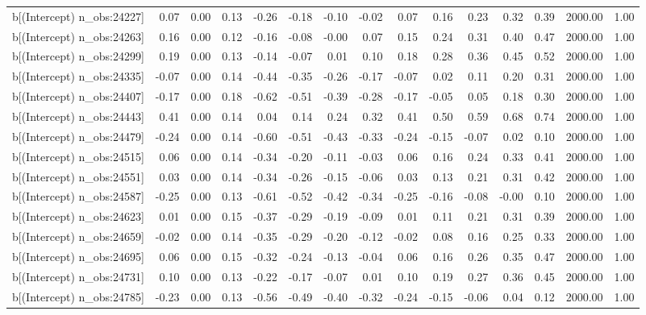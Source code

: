 \begin{table}[ht]
\begin{tabular}{rrrrrrrrrrrrrrr}
  b[(Intercept) n\_obs:24227] & 0.07 & 0.00 & 0.13 & -0.26 & -0.18 & -0.10 & -0.02 & 0.07 & 0.16 & 0.23 & 0.32 & 0.39 & 2000.00 & 1.00 \\ 
  b[(Intercept) n\_obs:24263] & 0.16 & 0.00 & 0.12 & -0.16 & -0.08 & -0.00 & 0.07 & 0.15 & 0.24 & 0.31 & 0.40 & 0.47 & 2000.00 & 1.00 \\ 
  b[(Intercept) n\_obs:24299] & 0.19 & 0.00 & 0.13 & -0.14 & -0.07 & 0.01 & 0.10 & 0.18 & 0.28 & 0.36 & 0.45 & 0.52 & 2000.00 & 1.00 \\ 
  b[(Intercept) n\_obs:24335] & -0.07 & 0.00 & 0.14 & -0.44 & -0.35 & -0.26 & -0.17 & -0.07 & 0.02 & 0.11 & 0.20 & 0.31 & 2000.00 & 1.00 \\ 
  b[(Intercept) n\_obs:24407] & -0.17 & 0.00 & 0.18 & -0.62 & -0.51 & -0.39 & -0.28 & -0.17 & -0.05 & 0.05 & 0.18 & 0.30 & 2000.00 & 1.00 \\ 
  b[(Intercept) n\_obs:24443] & 0.41 & 0.00 & 0.14 & 0.04 & 0.14 & 0.24 & 0.32 & 0.41 & 0.50 & 0.59 & 0.68 & 0.74 & 2000.00 & 1.00 \\ 
  b[(Intercept) n\_obs:24479] & -0.24 & 0.00 & 0.14 & -0.60 & -0.51 & -0.43 & -0.33 & -0.24 & -0.15 & -0.07 & 0.02 & 0.10 & 2000.00 & 1.00 \\ 
  b[(Intercept) n\_obs:24515] & 0.06 & 0.00 & 0.14 & -0.34 & -0.20 & -0.11 & -0.03 & 0.06 & 0.16 & 0.24 & 0.33 & 0.41 & 2000.00 & 1.00 \\ 
  b[(Intercept) n\_obs:24551] & 0.03 & 0.00 & 0.14 & -0.34 & -0.26 & -0.15 & -0.06 & 0.03 & 0.13 & 0.21 & 0.31 & 0.42 & 2000.00 & 1.00 \\ 
  b[(Intercept) n\_obs:24587] & -0.25 & 0.00 & 0.13 & -0.61 & -0.52 & -0.42 & -0.34 & -0.25 & -0.16 & -0.08 & -0.00 & 0.10 & 2000.00 & 1.00 \\ 
  b[(Intercept) n\_obs:24623] & 0.01 & 0.00 & 0.15 & -0.37 & -0.29 & -0.19 & -0.09 & 0.01 & 0.11 & 0.21 & 0.31 & 0.39 & 2000.00 & 1.00 \\ 
  b[(Intercept) n\_obs:24659] & -0.02 & 0.00 & 0.14 & -0.35 & -0.29 & -0.20 & -0.12 & -0.02 & 0.08 & 0.16 & 0.25 & 0.33 & 2000.00 & 1.00 \\ 
  b[(Intercept) n\_obs:24695] & 0.06 & 0.00 & 0.15 & -0.32 & -0.24 & -0.13 & -0.04 & 0.06 & 0.16 & 0.26 & 0.35 & 0.47 & 2000.00 & 1.00 \\ 
  b[(Intercept) n\_obs:24731] & 0.10 & 0.00 & 0.13 & -0.22 & -0.17 & -0.07 & 0.01 & 0.10 & 0.19 & 0.27 & 0.36 & 0.45 & 2000.00 & 1.00 \\ 
  b[(Intercept) n\_obs:24785] & -0.23 & 0.00 & 0.13 & -0.56 & -0.49 & -0.40 & -0.32 & -0.24 & -0.15 & -0.06 & 0.04 & 0.12 & 2000.00 & 1.00 \\ 

\end{tabular}
\end{table}
